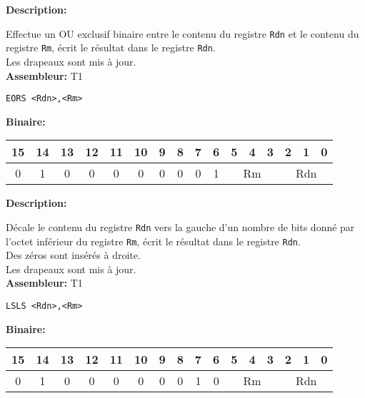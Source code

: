 \documentclass{article}
\newcounter{subsubsubsection}[subsubsection]
\begin{document}

\textbf{Description: }

Effectue un OU exclusif binaire entre le contenu du registre \texttt{Rdn} et le contenu du registre \texttt{Rm}, écrit le résultat dans le registre \texttt{Rdn}.\\
Les drapeaux sont mis à jour.\\

\textbf{Assembleur:} T1

\begin{lstlisting}
EORS <Rdn>,<Rm>
\end{lstlisting}

\textbf{Binaire:}\\

\begin{tabular}{| c c c c c c c c c c c c c c c c |}
\hline
15 & 14 & 13 & 12 & 11 & 10 & \multicolumn{1}{|c}{9} & 8 & 7 & 6 & \multicolumn{1}{|c}{5} & 4 & 3 & \multicolumn{1}{|c}{2} & 1 & 0 \\
\hline
0 & 1 & 0 & 0 & 0 & 0 & \multicolumn{1}{|c}{0} & 0 & 0 & 1 & \multicolumn{3}{|c}{Rm} & \multicolumn{3}{|c|}{Rdn} \\
\hline
\end{tabular}



\textbf{Description: }

Décale le contenu du registre \texttt{Rdn} vers la gauche d'un nombre de bits donné par l'octet inférieur du registre \texttt{Rm}, écrit le résultat dans le registre \texttt{Rdn}.\\
Des zéros sont insérés à droite.\\
Les drapeaux sont mis à jour.\\

\textbf{Assembleur:} T1

\begin{lstlisting}
LSLS <Rdn>,<Rm>
\end{lstlisting}

\textbf{Binaire:}\\

\begin{tabular}{| c c c c c c c c c c c c c c c c |}
\hline
15 & 14 & 13 & 12 & 11 & 10 & \multicolumn{1}{|c}{9} & 8 & 7 & 6 & \multicolumn{1}{|c}{5} & 4 & 3 & \multicolumn{1}{|c}{2} & 1 & 0 \\
\hline
0 & 1 & 0 & 0 & 0 & 0 & \multicolumn{1}{|c}{0} & 0 & 1 & 0 & \multicolumn{3}{|c}{Rm} & \multicolumn{3}{|c|}{Rdn} \\
\hline
\end{tabular}
\end{document}
